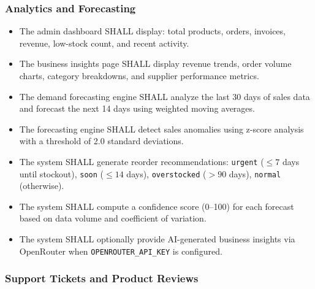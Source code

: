 \documentclass[12pt,onecolumn]{IEEEtran}
\begin{document}
\subsubsection{Analytics and Forecasting}

\begin{tcolorbox}[reqbox,title={FR-ANALYTICS: Analytics Requirements}]
\begin{itemize}[leftmargin=1.5em]
  \item {} The admin dashboard SHALL display: total products, orders, invoices, revenue, low-stock count, and recent activity.
  \item {} The business insights page SHALL display revenue trends, order volume charts, category breakdowns, and supplier performance metrics.
  \item {} The demand forecasting engine SHALL analyze the last 30 days of sales data and forecast the next 14 days using weighted moving averages.
  \item {} The forecasting engine SHALL detect sales anomalies using z-score analysis with a threshold of 2.0 standard deviations.
  \item {} The system SHALL generate reorder recommendations: \texttt{urgent} ($\leq 7$ days until stockout), \texttt{soon} ($\leq 14$ days), \texttt{overstocked} ($> 90$ days), \texttt{normal} (otherwise).
  \item {} The system SHALL compute a confidence score (0--100) for each forecast based on data volume and coefficient of variation.
  \item {} The system SHALL optionally provide AI-generated business insights via OpenRouter when \texttt{OPENROUTER\_API\_KEY} is configured.
\end{itemize}
\end{tcolorbox}

\subsubsection{Support Tickets and Product Reviews}
\end{document}
